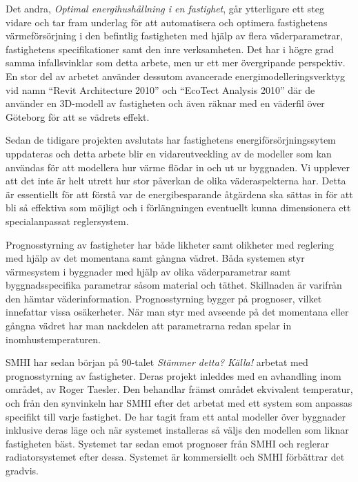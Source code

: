 Det andra, \textit{Optimal energihushållning i en fastighet}\cite{kandidatarbete2010},
går ytterligare ett steg vidare och tar fram underlag för att automatisera och
optimera fastighetens värmeförsörjning i den befintlig fastigheten med hjälp av
flera väderparametrar, fastighetens specifikationer samt den inre verksamheten. Det har i högre grad samma infallsvinklar som detta arbete, men ur ett mer övergripande perspektiv. En stor del av arbetet använder dessutom avancerade energimodelleringsverktyg vid namn ``Revit Architecture 2010'' och 
``EcoTect Analysis 2010'' där de använder en 3D-modell av fastigheten och även
räknar med en väderfil över Göteborg för att se vädrets effekt.

Sedan de tidigare projekten avslutats har fastighetens energiförsörjningssytem uppdateras och detta arbete blir en vidareutveckling av de modeller som kan användas för att modellera hur värme flödar in och ut ur byggnaden. Vi upplever att det inte är helt utrett hur stor påverkan de olika väderaspekterna har. Detta är essentiellt för att förstå var de energibesparande åtgärdena ska sättas in för att bli så effektiva som möjligt och i förlängningen eventuellt kunna dimensionera ett specialanpassat reglersystem.

Prognosstyrning av fastigheter har både likheter samt olikheter med reglering med hjälp av det momentana samt gångna vädret. Båda systemen styr värmesystem i byggnader med hjälp av olika väderparametrar samt byggnadsspecifika parametrar såsom material och täthet. Skillnaden är varifrån den hämtar väderinformation. Prognosstyrning bygger på prognoser, vilket innefattar vissa osäkerheter. När man styr med avseende på det momentana eller gångna vädret har man nackdelen att parametrarna redan spelar in inomhustemperaturen.

SMHI har sedan början på 90-talet \emph{\color{red} Stämmer detta? Källa!} arbetat med prognosstyrning av fastigheter. Deras projekt inleddes med en avhandling inom området, av Roger Taesler. Den behandlar främst området ekvivalent temperatur, och från den synvinkeln har SMHI efter det arbetat med ett system som anpassas specifikt till varje fastighet. De har tagit fram ett antal modeller över byggnader inklusive deras läge och när systemet installeras så väljs den modellen som liknar fastigheten bäst. Systemet tar sedan emot prognoser från SMHI och reglerar radiatorsystemet efter dessa. Systemet är kommersiellt och SMHI förbättrar det gradvis.






